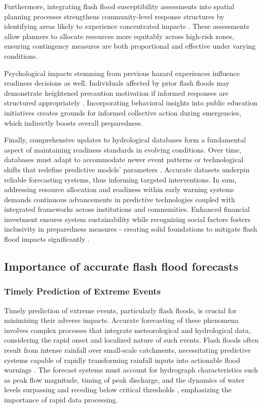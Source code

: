 Furthermore, integrating flash flood susceptibility assessments into spatial planning processes strengthens community-level response structures by identifying areas likely to experience concentrated impacts \citep{Zanchetta2020}. These assessments allow planners to allocate resources more equitably across high-risk zones, ensuring contingency measures are both proportional and effective under varying conditions.

Psychological impacts stemming from previous hazard experiences influence readiness decisions as well. Individuals affected by prior flash floods may demonstrate heightened precaution motivation if informed responses are structured appropriately \citep{Laudan2020}. Incorporating behavioral insights into public education initiatives creates grounds for informed collective action during emergencies, which indirectly boosts overall preparedness.

Finally, comprehensive updates to hydrological databases form a fundamental aspect of maintaining readiness standards in evolving conditions. Over time, databases must adapt to accommodate newer event patterns or technological shifts that redefine predictive models' parameters \citep{Yang2022}. Accurate datasets underpin reliable forecasting systems, thus informing targeted interventions.
In sum, addressing resource allocation and readiness within early warning systems demands continuous advancements in predictive technologies coupled with integrated frameworks across institutions and communities. Enhanced financial investment ensures system sustainability while recognizing social factors fosters inclusivity in preparedness measures - creating solid foundations to mitigate flash flood impacts significantly \citep{Msigwa2024}\citep{Jubach2016}\citep{Buzgaru2021}\citep{Msigwa2024}.


\subsection{Importance of accurate flash flood forecasts}


\subsubsection{Timely Prediction of Extreme Events}

Timely prediction of extreme events, particularly flash floods, is crucial for minimizing their adverse impacts. Accurate forecasting of these phenomena involves complex processes that integrate meteorological and hydrological data, considering the rapid onset and localized nature of such events. Flash floods often result from intense rainfall over small-scale catchments, necessitating predictive systems capable of rapidly transforming rainfall inputs into actionable flood warnings \citep{Kim2011}. The forecast systems must account for hydrograph characteristics such as peak flow magnitude, timing of peak discharge, and the dynamics of water levels surpassing and receding below critical thresholds \citep{Yatheendradas2008}, emphasizing the importance of rapid data processing.

